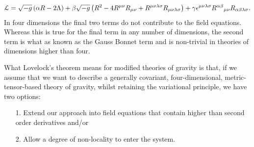  \[
 \label{EHgen}
 {\cal L}=\sqrt{-g}\left(\alpha R-2\Lambda\right)+\beta\sqrt{-g}\left(R^2-4R^{\mu\nu}R_{\mu\nu}+R^{\mu\nu\lambda\sigma}R_{\mu\nu\lambda\sigma}\right)+\gamma\epsilon^{\mu\nu\lambda\sigma}R^{\alpha\beta}{ }{ }_{\mu\nu}R_{\alpha\beta\lambda\sigma}
 .\]
 In four dimensions the final two terms do not contribute to the field equations. Whereas this is true for the final term in any number of dimensions, the second term is what as known as the Gauss Bonnet term and is non-trivial in theories of dimensions higher than four.

What Lovelock's theorem means for modified theories of gravity is that, if we assume that we want to describe a generally covariant, four-dimensional, metric-tensor-based theory of gravity, whilst retaining the variational principle, we have two options: 
\begin{enumerate}
\item[1.] Extend our approach into field equations that contain higher than second order derivatives and/or 
\item[2.] Allow a degree of non-locality to enter the system.\cite{Clifton:2011jh}
\end{enumerate}
\leavevmode

